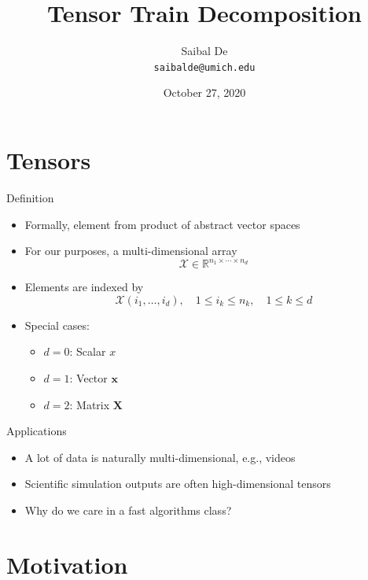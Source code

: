 \documentclass[aspectratio=169]{beamer}
\title{Tensor Train Decomposition}
\author{Saibal De \\ \texttt{saibalde@umich.edu}}
\date{October 27, 2020}
\renewcommand{\Vec}[1]{\bm{#1}}
\newcommand{\Mat}[1]{\mathbf{#1}}
\newcommand{\Tns}[1]{\mathcal{#1}}
\newcommand{\RR}{\mathbb{R}}
\begin{document}
\begin{frame}
    \titlepage
\end{frame}

\section{Tensors}

\begin{frame}{Definition}
  \begin{itemize}
    \item
      Formally, element from product of abstract vector spaces
    \item
      For our purposes, a multi-dimensional array
      \begin{equation*}
        \Tns{X} \in \RR^{n_1 \times \cdots \times n_d}
      \end{equation*}
    \item
      Elements are indexed by
      \begin{equation*}
        \Tns{X}(i_1, \ldots, i_d), \quad 1 \leq i_k \leq n_k, \quad 1 \leq k
        \leq d
      \end{equation*}
    \item
      Special cases:
      \begin{itemize}
        \item
          $d = 0$: Scalar $x$
        \item
          $d = 1$: Vector $\Vec{x}$
        \item
          $d = 2$: Matrix $\Mat{X}$
      \end{itemize}
  \end{itemize}
\end{frame}

\begin{frame}{Applications}
  \begin{itemize}
    \item
      A lot of data is naturally multi-dimensional, e.g., videos
    \item
      Scientific simulation outputs are often high-dimensional tensors
    \item
      Why do we care in a fast algorithms class?
  \end{itemize}
\end{frame}

\section{Motivation}
\end{document}
